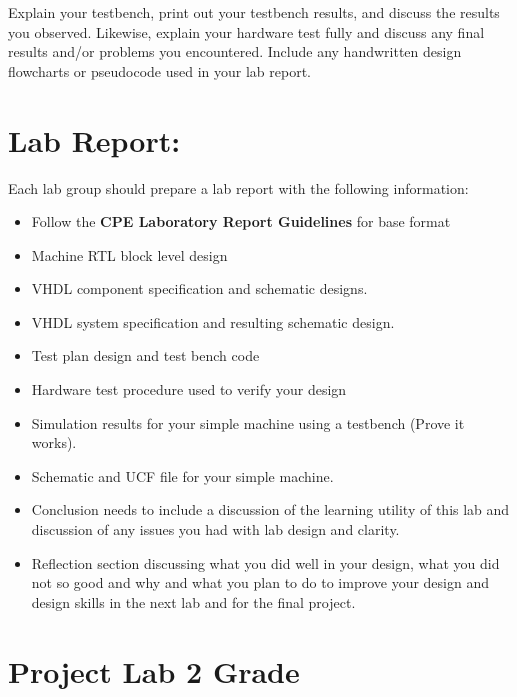 \documentclass{article}
\begin{document}
Explain your testbench, print out your testbench results, and discuss the results you observed. Likewise, explain your hardware test fully and discuss any final results and/or problems you encountered. Include any handwritten design flowcharts or pseudocode used in your lab report.

\section{Lab Report:}

Each lab group should prepare a lab report with the following information:
\begin{itemize}
  \item Follow the \textbf{CPE Laboratory Report Guidelines} for base format
  \item Machine RTL block level design
  \item VHDL component specification and schematic designs.
  \item VHDL system specification and resulting schematic design.
  \item Test plan design and test bench code
  \item Hardware test procedure used to verify your design
  \item Simulation results for your simple machine using a testbench (Prove it works).
  \item Schematic and UCF file for your simple machine.
  \item Conclusion needs to include a discussion of the learning utility of this lab and discussion of any issues you had with lab design and clarity.
  \item Reflection section discussing what you did well in your design, what you did not so good and why and what you plan to do to improve your design and design skills in the next lab and for the final project.
\end{itemize}

\section{Project Lab 2 Grade}
\end{document}
